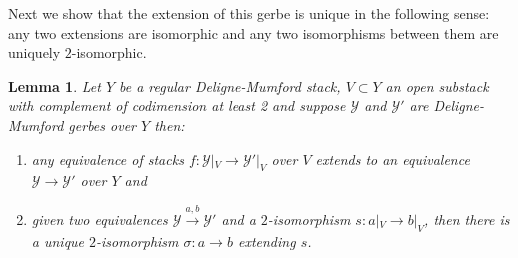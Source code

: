 \documentclass{amsart}
\newcommand{\cY}{\mathcal{Y}}
\newtheorem{Lemma}[theorem]{Lemma}
\theoremstyle{definition}
\newcommand{\marg}[1]{\normalsize{{\color{red}\footnote{{\color{blue}#1}}}{\marginpar[{\color{red}\hfill\tiny\thefootnote$\rightarrow$}]{{\color{red}$\leftarrow$\tiny\thefootnote}}}}}
\newcommand{\Mich}[1]{\marg{(Michele) #1}}
\newcommand{\Sid}[1]{\marg{(Sid) #1}}
\begin{document}
Next we show that the extension of this gerbe is unique in the following sense: any two extensions are isomorphic and any two isomorphisms between them are uniquely $2$-isomorphic. 

    \begin{Lemma} \label{uniquenessGerbe} Let $Y$ be a regular Deligne-Mumford stack, $V \subset Y$ an open substack with complement of codimension at least 2 and suppose $\cY$ and $\cY'$ are Deligne-Mumford gerbes over $Y$ then:
    \begin{enumerate}
        \item any equivalence of stacks $f
        \colon \cY|_{V}\to \cY'|_{V}$ over $V$ extends to an equivalence $\cY \to \cY'$ over $Y$ and
        \item given two equivalences $\cY \xrightarrow{a,b}\cY' $ and a $2$-isomorphism $s\colon a|_V \to b|_V$, then there is a unique $2$-isomorphism $\sigma:a \to b$ extending $s$.
    \end{enumerate} \end{Lemma}

\end{document}
